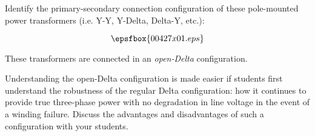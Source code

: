 

Identify the primary-secondary connection configuration of these pole-mounted power transformers (i.e. Y-Y, Y-Delta, Delta-Y, etc.):

$$\epsfbox{00427x01.eps}$$







These transformers are connected in an {\it open-Delta} configuration.







Understanding the open-Delta configuration is made easier if students first understand the robustness of the regular Delta configuration: how it continues to provide true three-phase power with no degradation in line voltage in the event of a winding failure.  Discuss the advantages and disadvantages of such a configuration with your students.




